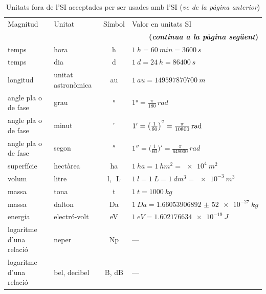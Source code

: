 \begin{ThreePartTable}
\begin{longtable}[h]{llcl}
   \midrule
   \endfirsthead
   \caption[]{Unitats fora de l'SI acceptades per ser usades amb l'SI (\emph{ve de la pàgina
   anterior})}\\
   \toprule[1pt]
    Magnitud & Unitat &  Símbol & Valor en unitats SI\\
   \midrule
   \endhead
   \midrule
   \multicolumn{4}{r}{\sffamily\bfseries\color{NavyBlue}(\emph{continua a la pàgina següent})}
   \endfoot
   \insertTableNotes
   \endlastfoot
   temps & minut &  \unit{min}& $\qty{1}{min} = \qty{60}{s}$ \\
   temps & hora & \unit{h} & $\qty{1}{h} = \qty{60}{min} = \qty{3600}{s}$ \\
   temps & dia & \unit{d} & $\qty{1}{d} = \qty{24}{h} = \qty{86400}{s}$\\
   longitud & unitat astronòmica\tnote{\color{blue}(a)} &  \unit{au} &  $\qty{1}{au} =  \qty{149597870700}{m}$ \\
   angle pla o de fase & grau &  \unit{\degree} &   $\ang{1} = \frac{\pi}{180}\unit{\,rad}$ \\[2mm]
   angle pla o de fase & minut & \unit{\arcminute} & $\ang{;1;} = \big(\frac{1}{60}\big)\raisebox{1.5mm}{\unit{\degree}} = \frac{\pi}{10800}\unit{\,rad}$ \\[2mm]
   angle pla  o de fase & segon & \unit{\arcsecond} & $\ang{;;1} = \big(\frac{1}{60}\big)' = \frac{\pi}{648000}\unit{\,rad}$ \\[2mm]
   superfície & hectàrea\tnote{\color{blue}(b)} & \unit{ha} & $\qty{1}{ha} = \qty{1}{hm^2} = \qty[print-unity-mantissa = false]{e4}{m^2}$\\
   volum & litre &  \unit{l},\unit{\,L}\tnote{\color{blue}(c)} & $\qty{1}{l} = \qty{1}{L} = \qty{1}{dm^3} = \qty[print-unity-mantissa = false]{e-3}{m^3}$ \\
   massa & tona\tnote{\color{blue}(d)} & \unit{t} & $\qty{1}{t} = \qty{1000}{kg}$\\
   massa & dalton\tnote{\color{blue}(e)} & Da & $\qty{1}{Da} = \qty{1,660 539 068 92(52)e-27}{kg}$\\
   energia & electró-volt\tnote{\color{blue}(f)} & eV & $\qty{1}{eV} = \qty{1,602176634e-19}{J}$ \\
   logaritme d'una relació & neper\tnote{\color{blue}(g)} & \unit{Np} & ---\\
   logaritme d'una relació & bel, decibel\tnote{\color{blue}(g)} &  \unit{B}, \unit{dB} & ---\\
   \bottomrule[1pt]
\end{longtable}
\end{ThreePartTable}
\index{\unit{\degree}}


